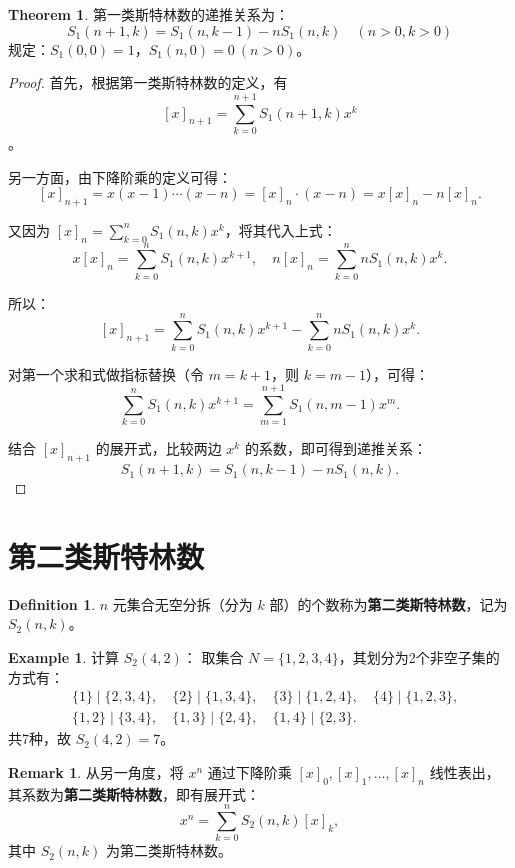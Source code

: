 \documentclass[oneside]{book}
\theoremstyle{definition}
\newtheorem{example}{Example}[section]
\newtheorem{definition}{Definition}[section]
\newtheorem{theorem}{Theorem}[section]
\newtheorem{remark}{Remark}[section]
\begin{document}
\begin{theorem}
	第一类斯特林数的递推关系为：
	\[ S_1(n + 1, k) = S_1(n, k - 1) - n S_1(n, k) \quad (n > 0, k > 0) \]
	规定：\( S_1(0, 0) = 1 \)，\( S_1(n, 0) = 0 \ (n > 0) \)。
\end{theorem}

\begin{proof}
	首先，根据第一类斯特林数的定义，有 \[ [x]_{n + 1} = \sum_{k = 0}^{n + 1} S_1(n + 1, k) x^k \]。
	
	另一方面，由下降阶乘的定义可得：
	\[ [x]_{n + 1} = x(x - 1)\cdots(x - n) = [x]_n \cdot (x - n) = x[x]_n - n[x]_n. \]
	
	又因为 \( [x]_n = \sum_{k = 0}^n S_1(n, k) x^k \)，将其代入上式：
	\[ x[x]_n = \sum_{k = 0}^n S_1(n, k) x^{k + 1}, \quad n[x]_n = \sum_{k = 0}^n n S_1(n, k) x^k. \]
	
	所以：
	\[ [x]_{n + 1} = \sum_{k = 0}^n S_1(n, k) x^{k + 1} - \sum_{k = 0}^n n S_1(n, k) x^k. \]
	
	对第一个求和式做指标替换（令 \( m = k + 1 \)，则 \( k = m - 1 \)），可得：
	\[ \sum_{k = 0}^n S_1(n, k) x^{k + 1} = \sum_{m = 1}^{n + 1} S_1(n, m - 1) x^m. \]
	
	结合 \( [x]_{n + 1} \) 的展开式，比较两边 \( x^k \) 的系数，即可得到递推关系：
	\[ S_1(n + 1, k) = S_1(n, k - 1) - n S_1(n, k). \]
\end{proof}

\section{第二类斯特林数}

\begin{definition}
	\( n \) 元集合无空分拆（分为 \( k \) 部）的个数称为\textbf{第二类斯特林数}，记为 \( S_2(n, k) \)。
\end{definition}

\begin{example}
	计算 \( S_2(4, 2) \)：
	取集合 \( N = \{1, 2, 3, 4\} \)，其划分为2个非空子集的方式有：
	\[
	\begin{aligned}
		& \{1\} \mid \{2, 3, 4\}, \quad \{2\} \mid \{1, 3, 4\}, \quad \{3\} \mid \{1, 2, 4\}, \quad \{4\} \mid \{1, 2, 3\}, \\
		& \{1, 2\} \mid \{3, 4\}, \quad \{1, 3\} \mid \{2, 4\}, \quad \{1, 4\} \mid \{2, 3\}.
	\end{aligned}
	\]
	共7种，故 \( S_2(4, 2) = 7 \)。
\end{example}

\begin{remark}
	从另一角度，将 \( x^n \) 通过下降阶乘 \( [x]_0, [x]_1, \dots, [x]_n \) 线性表出，其系数为\textbf{第二类斯特林数}，即有展开式：
	\[ x^n = \sum_{k = 0}^n S_2(n, k) [x]_k, \]
	其中 \( S_2(n, k) \) 为第二类斯特林数。
\end{remark}
\end{document}
